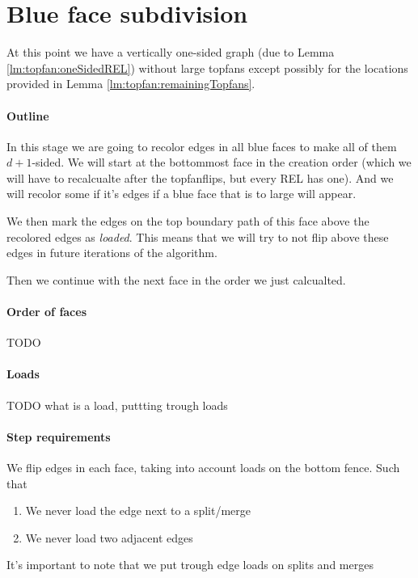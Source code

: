 
\section{Blue face subdivision}


At this point we have a vertically one-sided graph (due to Lemma \ref{lm:topfan:oneSidedREL}) without large topfans except possibly for the locations provided in Lemma \ref{lm:topfan:remainingTopfans}.

\paragraph{Outline}
In this stage we are going to recolor edges in all blue faces to make all of them $d+1$-sided. We will start at the bottommost face in the creation order (which we will have to recalcualte after the topfanflips, but every REL has one). And we will recolor some if it's edges if a blue face that is to large will appear.

We then mark the edges on the top boundary path of this face above the recolored edges as \emph{loaded}. This means that we will try to not flip above these edges in future iterations of the algorithm.

Then we continue with the next face in the order we just calcualted.

\paragraph{Order of faces}
TODO

\paragraph{Loads}
TODO what is a load, puttting trough loads


\paragraph{Step requirements}
We flip edges in each face, taking into account loads on the bottom fence. Such that

\begin{enumerate}
  \item We never load the edge next to a split/merge
  \item We never load two adjacent edges
\end{enumerate}

It's important to note that we put trough edge loads on splits and merges

